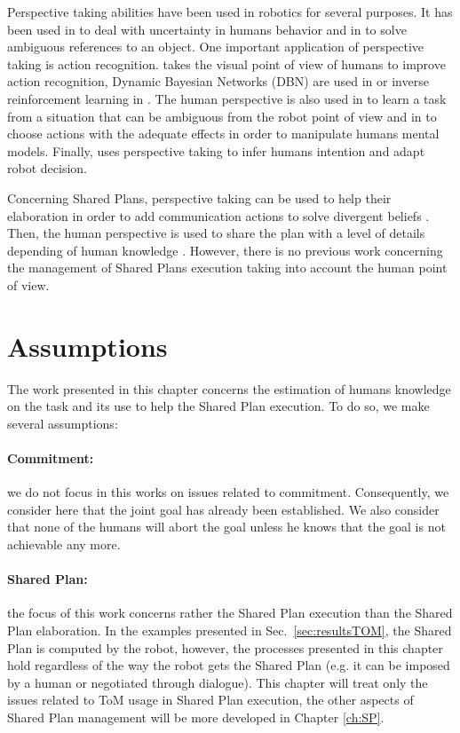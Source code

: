 \documentclass[english,a4paper,11pt,twoside]{StyleThese}
\begin{document}
Perspective taking abilities have been used in robotics for several purposes. It has been used in \cite{hiatt2011accommodating} to deal with uncertainty in humans behavior and in \cite{ros2010solving} to solve ambiguous references to an object. One important application of perspective taking is action recognition. \cite{johnson2005perceptual} takes the visual point of view of humans to improve action recognition, Dynamic Bayesian Networks (DBN) are used in \cite{baker2014modeling} or inverse reinforcement learning  in \cite{nagai2015probabilistic}. The human perspective is also used in \cite{breazeal2006using} to learn a task from a situation that can be ambiguous from the robot point of view and in \cite{gray2014manipulating} to choose actions with the adequate effects in order to manipulate humans mental models. Finally, \cite{gorur2017toward} uses perspective taking to infer humans intention and adapt robot decision.

Concerning Shared Plans, perspective taking can be used to help their elaboration in order to add communication actions to solve divergent beliefs \cite{guitton2012belief}. Then, the human perspective is used to share the plan with a level of details depending of human knowledge \cite{milliez2016using}. However, there is no previous work concerning the management of Shared Plans execution taking into account the human point of view. 

\section{Assumptions}


The work presented in this chapter concerns the estimation of humans knowledge on the task and its use to help the Shared Plan execution. To do so, we make several assumptions:

\paragraph{Commitment:} we do not focus in this works on issues related to commitment. Consequently, we consider here that the joint goal has already been established. We also consider that none of the humans will abort the goal unless he knows that the goal is not achievable any more.

\paragraph{Shared Plan:} the focus of this work concerns rather the Shared Plan execution than the Shared Plan elaboration. In the examples presented in Sec.~\ref{sec:resultsTOM}, the Shared Plan is computed by the robot, however, the processes presented in this chapter hold regardless of the way the robot gets the Shared Plan (e.g. it can be imposed by a human or negotiated through dialogue). This chapter will treat only the issues related to ToM usage in Shared Plan execution, the other aspects of Shared Plan management will be more developed in Chapter \ref{ch:SP}.
\end{document}

